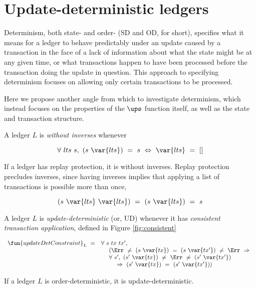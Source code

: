 \section{Update-deterministic ledgers}
\label{sec:update}

Determinism, both state- and order- (SD and OD, for short), specifies what it means for a ledger to behave
predictably under an update caused by a transaction in the face of a lack of information about
what the state might be at any given time, or what transactions happen to have
been processed before the transaction doing the update in question.
This approach to specifying determinism focuses on allowing only certain transactions
to be processed.

Here we propose another angle from which to investigate determinism,
which instead focuses on the properties of the $\ups$ function itself, as well
as the state and transaction structure.

A ledger $L$ is \emph{without inverses} whenever

  \[ \forall~lts~s,~(s~\var{lts})~=~s~\Leftrightarrow~\var{lts}~=~[] \]

If a ledger has replay protection, it is without inverses.
Replay protection precludes inverses, since having
inverses implies that applying a list of transactions is possible more than once,

\[ (s~\var{lts}~\var{lts})~=~(s~\var{lts})~=~s \]

A ledger $L$ is \emph{update-deterministic} (or, UD) whenever it has
\emph{consistent transaction application}, defined in Figure \ref{fig:consistent}

\begin{figure*}[htb]
  \begin{equation*}
    \begin{array}{l@{~~}l@{~~}ll}
    \fun{updateDetConstraint}_L ~=~ & \forall~s~tx~tx',~\\
    & ~~~~ (\Err~\neq~(s~\var{tx})~=~(s~\var{tx'})~\neq~\Err~\Rightarrow~\\
    & ~~~~\forall~s',~(s'~\var{tx})~\neq~\Err~\neq~(s'~\var{tx'}) \\
    & ~~~~~~~~\Rightarrow~(s'~\var{tx})~=~(s'~\var{tx'}))
    \end{array}
  \end{equation*}
  \caption{Consistent transaction application}
  \label{fig:consistent}
\end{figure*}


\begin{theorem}
  If a ledger $L$ is order-deterministic, it is update-deterministic.
\end{theorem}


